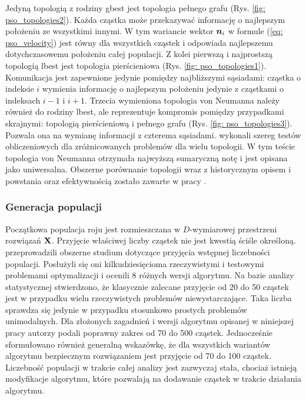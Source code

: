 Jedyną topologią z rodziny gbest jest topologia pełnego grafu (Rys. \ref{fig: pso_topologies2}). Każda cząstka może przekazywać informację o najlepszym położeniu ze wszystkimi innymi. W tym wariancie wektor $\bm{n}_i$ w formule (\ref{eq: pso_velocity}) jest równy dla wszystkich cząstek i odpowiada najlepszemu dotychczasowemu położeniu całej populacji. Z kolei pierwszą i najprostszą topologią lbest jest topologia pierścieniowa (Rys. \ref{fig: pso_topologies1}). Komunikacja jest zapewnione jedynie pomiędzy najbliższymi sąsiadami: cząstka o indeksie $i$ wymienia informację o najlepszym położeniu jedynie z cząstkami o indeksach $i-1$ i $i+1$. Trzecia wymieniona topologia von Neumanna należy również do rodziny lbest, ale reprezentuje kompromis pomiędzy przypadkami skrajnymi: topologią pierścieniową i pełnego grafu (Rys. \ref{fig: pso_topologies3}). Pozwala ona na wymianę informacji z czterema sąsiadami.\parencite{Kennedy2002} wykonali szereg testów obliczeniowych dla zróżnicowanych problemów dla wielu topologii. W tym teście topologia von Neumanna otrzymała najwyższą sumaryczną notę i jest opisana jako uniwersalna. Obszerne porównanie topologii wraz z historycznym opisem i powstania oraz efektywnością zostało zawarte w pracy \parencite{Blackwell2019}.

\subsubsection{Generacja populacji}
Początkowa populacja roju jest rozmieszczana w $D$-wymiarowej przestrzeni rozwiązań $\mathbf{X}$. Przyjęcie właściwej liczby cząstek nie jest kwestią ściśle określoną. \cite{Piotrowski2020} przeprowadzili obszerne studium dotyczące przyjęcia wstępnej liczebności populacji. Posłużyli się oni kilkudziesięcioma rzeczywistymi i testowymi problemami optymalizacji i ocenili 8 różnych wersji algorytmu. Na bazie analizy statystycznej stwierdzono, że klasycznie zalecane przyjęcie od 20 do 50 \parencite{Kennedy1995,Liang2006,Chen2012,Harrison2018} cząstek jest w przypadku wielu rzeczywistych problemów niewystarczające. Taka liczba sprawdza się jedynie w przypadku stosunkowo prostych problemów unimodalnych. Dla złożonych zagadnień i wersji algorytmu opisanej w niniejszej pracy autorzy podali poprawny zakres od 70 do 500 cząstek. Jednocześnie sformułowano również generalną wskazówkę, że dla wszystkich wariantów algorytmu bezpiecznym rozwiązaniem jest przyjęcie od 70 do 100 cząstek. Liczebność populacji w trakcie całej analizy jest zazwyczaj stała, chociaż istnieją modyfikacje algorytmu, które pozwalają na dodawanie cząstek w trakcie działania algorytmu.

